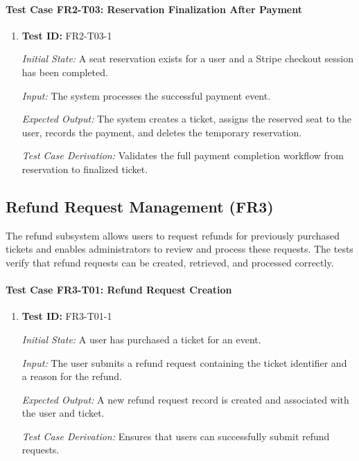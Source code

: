 \documentclass[12pt, titlepage]{article}
\begin{document}
\paragraph{Test Case FR2-T03: Reservation Finalization After Payment}

\begin{enumerate}

\item \textbf{Test ID:} FR2-T03-1

\textit{Initial State:} A seat reservation exists for a user and a Stripe checkout session has been completed.

\textit{Input:} The system processes the successful payment event.

\textit{Expected Output:} The system creates a ticket, assigns the reserved seat to the user, records the payment, and deletes the temporary reservation.

\textit{Test Case Derivation:} Validates the full payment completion workflow from reservation to finalized ticket.

\end{enumerate}


\subsection{Refund Request Management (FR3)}

The refund subsystem allows users to request refunds for previously purchased tickets and enables administrators to review and process these requests. The tests verify that refund requests can be created, retrieved, and processed correctly.

\paragraph{Test Case FR3-T01: Refund Request Creation}

\begin{enumerate}

\item \textbf{Test ID:} FR3-T01-1

\textit{Initial State:} A user has purchased a ticket for an event.

\textit{Input:} The user submits a refund request containing the ticket identifier and a reason for the refund.

\textit{Expected Output:} A new refund request record is created and associated with the user and ticket.

\textit{Test Case Derivation:} Ensures that users can successfully submit refund requests.

\end{enumerate}
\end{document}
